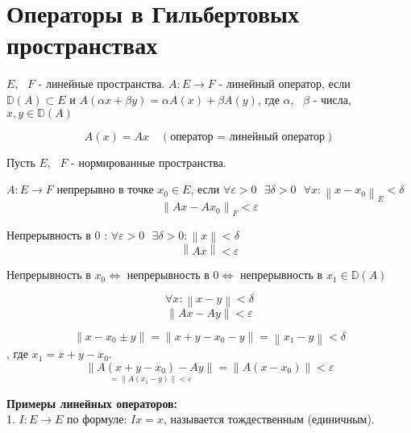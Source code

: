 \documentclass[12pt, a4paper]{report}
\begin{document}
\fi


\section{Операторы в Гильбертовых пространствах}

\begin{definition}
    \( E, \text{ }  F  \) - линейные пространства. \( A: E \to  F  \) - линейный оператор, если \( \mathbb{D} (A )\subset E  \) и \( A (\alpha x + \beta y )= \alpha A(x ) + \beta A(y ) \), где \( \alpha, \text{ }  \beta \) - числа, \( x, y \in  \mathbb{D} (A) \) 

    \[ A(x )= Ax \quad  (\text{оператор = линейный оператор} ) \] 
\end{definition}

Пусть \( E , \text{  }  F  \) - нормированные пространства. 

\begin{definition}
     \( A: E \to  F  \) непрерывно в точке \( x_0 \in  E \), если \( \forall  \varepsilon > 0 \text{ }  \exists  \delta >0 \text{ }  \forall  x: \left\lVert  x - x_0  \right\rVert_{E }  < \delta  \) 
     \[ \left\lVert Ax - A x_0  \right\rVert _F < \varepsilon  \] 
\end{definition}

Непрерывность в 0 : \( \forall  \varepsilon > 0 \text{ }  \exists  \delta > 0  : \left\lVert  x  \right\rVert < \delta  \) 
\[ \left\lVert Ax  \right\rVert< \varepsilon \] 

Непрерывность в \( x_0  \Leftrightarrow  \) непрерывность в \( 0 \Leftrightarrow   \)  непрерывность в \( x_1 \in  \mathbb{D}(A) \) 

\[ \forall  x : \left\lVert x - y         \right\rVert < \delta  \] 
\[ \left\lVert  Ax - Ay  \right\rVert < \varepsilon \] 

\[ \left\lVert  x - x_0 \pm y  \right\rVert = \left\lVert x+ y - x_0 - y  \right\rVert = \left\lVert x_1 - y  \right\rVert< \delta \] 
, где \( x_1 = x+ y - x_0 \).
\[ \underset{= \left\lVert A(x_1 - y ) \right\rVert < \varepsilon}{\left\lVert A (x + y - x_0 ) - A y  \right\rVert}= \left\lVert  A(x - x_0 )  \right\rVert < \varepsilon  \] 

\textbf{Примеры линейных операторов: } \\

1. \( I : E \to  E  \) по формуле: \( I x = x  \), называется тождественным (единичным).
\end{document}
